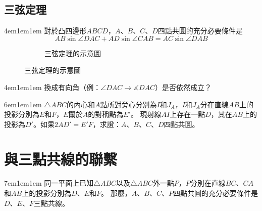 \documentclass[12pt]{article}
\begin{document}
\subsection{三弦定理}
\begin{mybox}[定理]{4em}{1em}{1em}
    對於凸四邊形$ABCD$，$A$、$B$、$C$、$D$四點共圓的充分必要條件是
    $$AB\sin{\angle{DAC}} + AD\sin{\angle{CAB}} = AC\sin{\angle{DAB}}$$
    \begin{figure}[H]
        \centering
        \begin{subfigure}[b]{\textwidth}
            \centering
            \caption{三弦定理的示意圖}
            \label{fig:concyclic_s2.4-1}
        \end{subfigure}
    \end{figure}
\end{mybox}
\begin{mybox}[思考]{4em}{1em}{1em}
    換成有向角（例：$\angle{DAC}\rightarrow\measuredangle{DAC}$）是否依然成立？
\end{mybox}
\begin{mybox}[例題\thesubsection-1]{6em}{1em}{1em}
    $\triangle{ABC}$的內心和$A$點所對旁心分別為$I$和$J_A$，$I$和$J_A$分在直線$AB$上的投影分別為$E$和$F$，$E$關於$A$的對稱點為$E'$。
    現射線$AI$上存在一點$D$，其在$AB$上的投影為$D'$。如果$2AD'=E'F$，求證：$A$、$B$、$C$、$D$四點共圓。
\end{mybox}
\section{與三點共線的聯繫}
\begin{mybox}[西姆松定理]{7em}{1em}{1em}
    同一平面上已知$\triangle{ABC}$以及$\triangle{ABC}$外一點$P$，$P$分別在直線$BC$、$CA$和$AB$上的投影分別為$D$、$E$和$F$。
    那麼，$A$、$B$、$C$、$P$四點共圓的充分必要條件是$D$、$E$、$F$三點共線。
\end{mybox}
\end{document}

